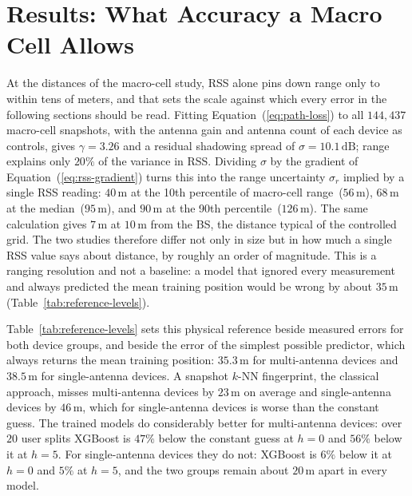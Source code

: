 \section{Results: What Accuracy a Macro Cell Allows}
\label{sec:results-error-scale}

At the distances of the macro-cell study, RSS alone pins down range only to within tens of meters, and that sets the scale against which every error in the following sections should be read. Fitting Equation~(\ref{eq:path-loss}) to all $144{,}437$ macro-cell snapshots, with the antenna gain and antenna count of each device as controls, gives $\gamma = 3.26$ and a residual shadowing spread of $\sigma = 10.1\,\text{dB}$; range explains only $20\%$ of the variance in RSS. Dividing $\sigma$ by the gradient of Equation~(\ref{eq:rss-gradient}) turns this into the range uncertainty $\sigma_r$ implied by a single RSS reading: $40\,\text{m}$ at the 10th percentile of macro-cell range~($56\,\text{m}$), $68\,\text{m}$ at the median~($95\,\text{m}$), and $90\,\text{m}$ at the 90th percentile~($126\,\text{m}$). The same calculation gives $7\,\text{m}$ at $10\,\text{m}$ from the BS, the distance typical of the controlled grid. The two studies therefore differ not only in size but in how much a single RSS value says about distance, by roughly an order of magnitude. This is a ranging resolution and not a baseline: a model that ignored every measurement and always predicted the mean training position would be wrong by about $35\,\text{m}$ (Table~\ref{tab:reference-levels}).

Table~\ref{tab:reference-levels} sets this physical reference beside measured errors for both device groups, and beside the error of the simplest possible predictor, which always returns the mean training position: $35.3\,\text{m}$ for multi-antenna devices and $38.5\,\text{m}$ for single-antenna devices. A snapshot $k$-NN fingerprint, the classical approach, misses multi-antenna devices by $23\,\text{m}$ on average and single-antenna devices by $46\,\text{m}$, which for single-antenna devices is worse than the constant guess. The trained models do considerably better for multi-antenna devices: over $20$ user splits XGBoost is $47\%$ below the constant guess at $h=0$ and $56\%$ below it at $h=5$. For single-antenna devices they do not: XGBoost is $6\%$ below it at $h=0$ and $5\%$ at $h=5$, and the two groups remain about $20\,\text{m}$ apart in every model.

